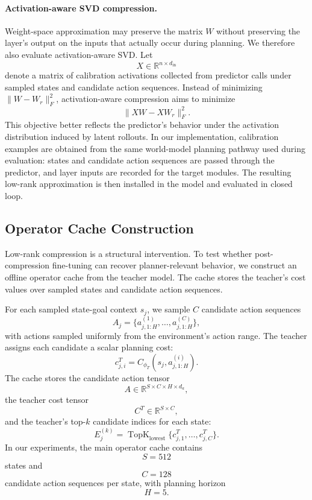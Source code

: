 \documentclass[11pt]{article}
\begin{document}
\paragraph{Activation-aware SVD compression.}
Weight-space approximation may preserve the matrix $W$ without preserving the layer's output on the inputs that actually occur during planning. We therefore also evaluate activation-aware SVD. Let
\[
    X \in \mathbb{R}^{n \times d_{\mathrm{in}}}
\]
denote a matrix of calibration activations collected from predictor calls under sampled states and candidate action sequences. Instead of minimizing $\lVert W - W_r \rVert_F^2$, activation-aware compression aims to minimize
\[
    \lVert XW - XW_r \rVert_F^2.
\]
This objective better reflects the predictor's behavior under the activation distribution induced by latent rollouts. In our implementation, calibration examples are obtained from the same world-model planning pathway used during evaluation: states and candidate action sequences are passed through the predictor, and layer inputs are recorded for the target modules. The resulting low-rank approximation is then installed in the model and evaluated in closed loop.

\subsection{Operator Cache Construction}
\label{sec:operator_cache}

Low-rank compression is a structural intervention. To test whether post-compression fine-tuning can recover planner-relevant behavior, we construct an offline operator cache from the teacher model. The cache stores the teacher's cost values over sampled states and candidate action sequences.

For each sampled state-goal context $s_j$, we sample $C$ candidate action sequences
\[
    A_j =
    \{a_{j,1:H}^{(1)}, \dots, a_{j,1:H}^{(C)}\},
\]
with actions sampled uniformly from the environment's action range. The teacher assigns each candidate a scalar planning cost:
\[
    c_{j,i}^{T}
    =
    C_{\phi_T}(s_j, a_{j,1:H}^{(i)}).
\]
The cache stores the candidate action tensor
\[
    A \in \mathbb{R}^{S \times C \times H \times d_a},
\]
the teacher cost tensor
\[
    C^T \in \mathbb{R}^{S \times C},
\]
and the teacher's top-$k$ candidate indices for each state:
\[
    E_j^{(k)}
    =
    \operatorname{TopK}_{\mathrm{lowest}}
    \{c_{j,1}^{T}, \dots, c_{j,C}^{T}\}.
\]
In our experiments, the main operator cache contains
\[
    S = 512
\]
states and
\[
    C = 128
\]
candidate action sequences per state, with planning horizon
\[
    H = 5.
\]
\end{document}

